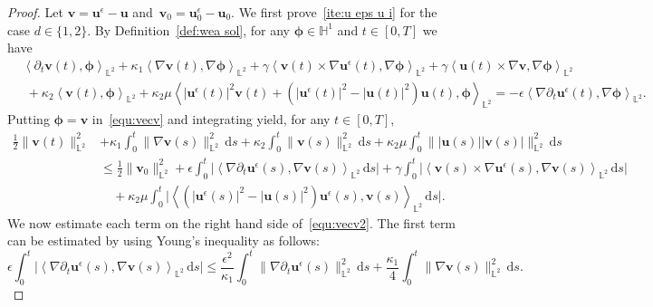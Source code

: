 \documentclass[11pt,reqno]{amsart}
\theoremstyle{definition}
\numberwithin{equation}{section}
\newcommand{\bff}{\boldsymbol}
\newcommand{\bb}{\mathbb}
\newcommand{\ds}{\mathrm{d}s}
\newcommand{\nn}{\nonumber}
\newcommand{\inpro}[2]{\left\langle#1,#2\right\rangle}
\begin{document}
\begin{proof}
	Let $\bff{v} = \bff{u}^\epsilon-\bff{u}$ 
	and~$\bff{v}_0 = \bff{u}_0^\epsilon-\bff{u}_0$. We first prove~\ref{ite:u eps u i} for the case $d\in \{1,2\}$.
	By Definition~\ref{def:wea sol}, for any $\bff{\phi}\in \bb{H}^1$ and $t\in [0,T]$ we have
	\begin{align}\label{equ:vecv}
		&\inpro{\partial_t \bff{v}(t)}{\bff{\phi}}_{\bb{L}^2}
		+
		\kappa_1 \inpro{\nabla\bff{v}(t)}{\nabla\bff{\phi}}_{\bb{L}^2}
		+
		\gamma \inpro{\bff{v}(t)\times\nabla\bff{u}^\epsilon(t)}{\nabla\bff{\phi}}_{\bb{L}^2}
		+
		\gamma \inpro{\bff{u}(t)\times\nabla\bff{v}}{\nabla\bff{\phi}}_{\bb{L}^2}
		\nn 
		\\
		&\;
		+
		\kappa_2 \inpro{\bff{v}(t)}{\bff{\phi}}_{\bb{L}^2}
		+
		\kappa_2\mu \inpro{|\bff{u}^\epsilon(t)|^2\bff{v}(t) + (|\bff{u}^\epsilon(t)|^2-|\bff{u}(t)|^2)\bff{u}(t)}{\bff{\phi}}_{\bb{L}^2}
		= 
		-\epsilon \inpro{\nabla\partial_t \bff{u}^\epsilon(t)}{\nabla\bff{\phi}}_{\bb{L}^2}.
	\end{align}
	Putting $\bff{\phi} = \bff{v}$ in~\eqref{equ:vecv} and integrating yield, for any $t\in [0,T]$,
	\begin{align}\label{equ:vecv2}
		\frac12 \|\bff{v}(t)\|_{\bb{L}^2}^2
		&+\kappa_1\int_0^t \|\nabla\bff{v}(s)\|^2_{\bb{L}^2}\,\ds
		+
		\kappa_2\int_0^t \|\bff{v}(s)\|^2_{\bb{L}^2}\,\ds
		+
		\kappa_2\mu\int_0^t\||\bff{u}(s)| |\bff{v}(s)|\|^2_{\bb{L}^2}\,\ds
		\nn\\
		&\le
		\frac12 \|\bff{v}_0\|_{\bb{L}^2}^2
		+
		\epsilon\int_0^t 
		\Big|
		\inpro{\nabla\partial_t \bff{u}^\epsilon(s)}{\nabla\bff{v}(s)}_{\bb{L}^2}\,\ds
		\Big|
		+
		\gamma\int_0^t 
		\Big|
		\inpro{\bff{v}(s)\times\nabla\bff{u}^\epsilon(s)}{\nabla\bff{v}(s)}_{\bb{L}^2}\,\ds
		\Big|
		\nn \\
		&\quad+\kappa_2\mu
		\int_0^t 
		\Big|
		\inpro{(|\bff{u}^\epsilon(s)|^2-|\bff{u}(s)|^2)\bff{u}^\epsilon(s)}{\bff{v}(s)}_{\bb{L}^2} \,\ds
		\Big|.
	\end{align}
	We now estimate each term on the right hand side of~\eqref{equ:vecv2}. 
	The first term can be estimated by using Young's inequality as follows:
	\begin{equation}\label{equ:uni4}
		\epsilon \int_0^t 
		\Big|
		\inpro{\nabla\partial_t \bff{u}^\epsilon(s)}{\nabla\bff{v}(s)}_{\bb{L}^2}\,\ds
		\Big|
		\leq 
		\frac{\epsilon^2}{\kappa_1}\int_0^t \|\nabla\partial_t \bff{u}^\epsilon(s)\|_{\bb{L}^2}^2\,\ds
		+
		\frac{\kappa_1}{4}\int_0^t \|\nabla\bff{v}(s)\|^2_{\bb{L}^2}\,\ds.
	\end{equation}

\end{proof}
\end{document}
